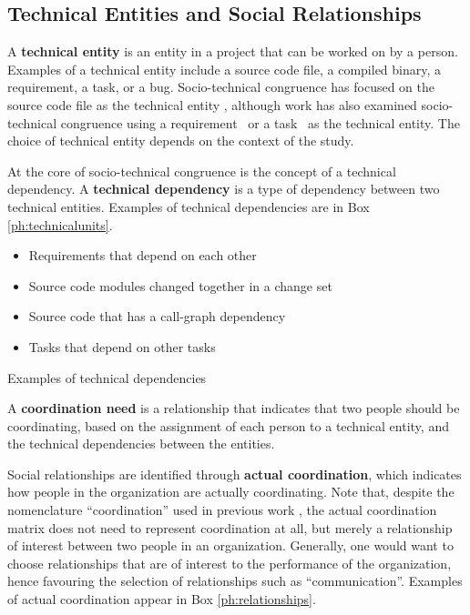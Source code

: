 \subsection{Technical Entities and Social Relationships}
A \textbf{technical entity} is an entity in a project that can be worked on by a person. Examples of a technical entity include a source code file, a compiled binary, a requirement, a task, or a bug. Socio-technical congruence has focused on the source code file as the technical entity \cite{cataldo:cscw:2006, ehrlich2008:gaps}, although work has also examined socio-technical congruence using a requirement~\cite{damian2010:rdc,marczak2009:crossfunctional} or a task~\cite{wolf:ieee:2009} as the technical entity. The choice of technical entity depends on the context of the study.

At the core of socio-technical congruence is the concept of a technical dependency. A \textbf{technical dependency} is a type of dependency between two technical entities. Examples of technical dependencies are in Box \ref{ph:technicalunits}.

\begin{placeholder}[t]
\begin{itemize}
\item Requirements that depend on each other~\cite{marczak:re:2008,marczak2009:crossfunctional}
\item Source code modules changed together in a change set~\cite{cataldo:cscw:2006,cataldo:esem:2008}
\item Source code that has a call-graph dependency~\cite{deSouza2004:thwarts_collaboration}
\item Tasks that depend on other tasks \cite{wolf:ieee:2009}
\end{itemize}
\caption{Examples of technical dependencies}
\label{ph:technicalunits}
\end{placeholder}

A \textbf{coordination need} is a relationship that indicates that two people should be coordinating, based on the assignment of each person to a technical entity, and the technical dependencies between the entities.

Social relationships are identified through \textbf{actual coordination}, which indicates how people in the organization are actually coordinating. Note that, despite the nomenclature ``coordination'' used in previous work \cite{cataldo:cscw:2006}, the actual coordination matrix does not need to represent coordination at all, but merely a relationship of interest between two people in an organization. Generally, one would want to choose relationships that are of interest to the performance of the organization, hence favouring the selection of relationships such as ``communication''. Examples of actual coordination appear in Box \ref{ph:relationships}.




